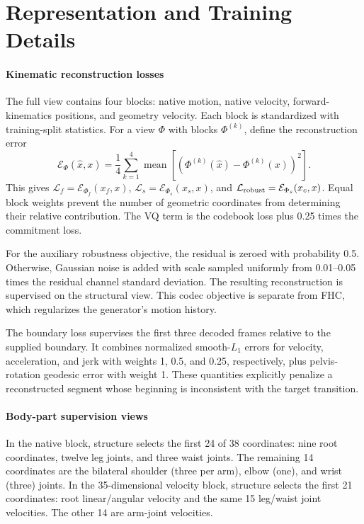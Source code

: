 \section{Representation and Training Details}
\label{app:training}

\paragraph{Kinematic reconstruction losses}
The full view contains four blocks: native motion, native velocity, forward-kinematics positions, and geometry velocity. Each block is standardized with training-split statistics. For a view $\Phi$ with blocks $\Phi^{(k)}$, define the reconstruction error
\begin{equation}
\mathcal E_{\Phi}(\hat x,x)=\frac{1}{4}\sum_{k=1}^{4}
\operatorname{mean}\!\left[\left(\Phi^{(k)}(\hat x)-\Phi^{(k)}(x)\right)^2\right].
\end{equation}
This gives $\mathcal L_f=\mathcal E_{\Phi_f}(x_f,x)$, $\mathcal L_s=\mathcal E_{\Phi_s}(x_s,x)$, and $\mathcal L_{\rm robust}=\mathcal E_{\Phi_s}(x_c,x)$. Equal block weights prevent the number of geometric coordinates from determining their relative contribution. The VQ term is the codebook loss plus 0.25 times the commitment loss.

For the auxiliary robustness objective, the residual is zeroed with probability 0.5. Otherwise, Gaussian noise is added with scale sampled uniformly from 0.01--0.05 times the residual channel standard deviation. The resulting reconstruction is supervised on the structural view. This codec objective is separate from FHC, which regularizes the generator's motion history.

The boundary loss supervises the first three decoded frames relative to the supplied boundary. It combines normalized smooth-$L_1$ errors for velocity, acceleration, and jerk with weights 1, 0.5, and 0.25, respectively, plus pelvis-rotation geodesic error with weight 1. These quantities explicitly penalize a reconstructed segment whose beginning is inconsistent with the target transition.

\paragraph{Body-part supervision views}
In the native block, structure selects the first 24 of 38 coordinates: nine root coordinates, twelve leg joints, and three waist joints. The remaining 14 coordinates are the bilateral shoulder (three per arm), elbow (one), and wrist (three) joints. In the 35-dimensional velocity block, structure selects the first 21 coordinates: root linear/angular velocity and the same 15 leg/waist joint velocities. The other 14 are arm-joint velocities.

